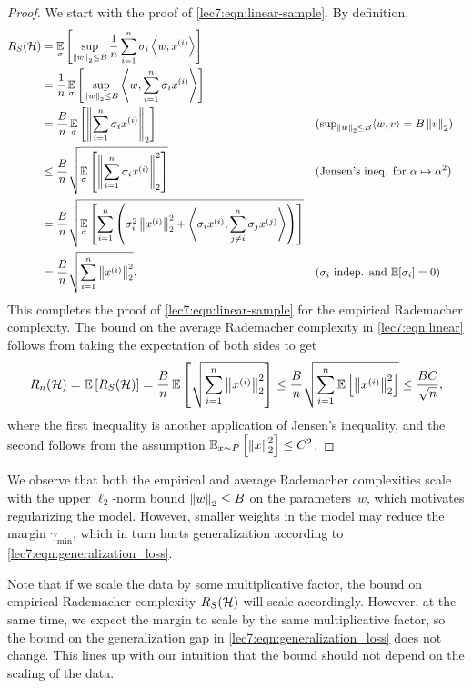 \begin{proof}
We start with the proof of \eqref{lec7:eqn:linear-sample}. By definition,
\begin{align}
    R_S(\mathcal{H}) 
    &= \operatorname*{\mathbb{E}}_\sigma\left[ \sup_{\left\|w\right\|_2 \le B} \frac{1}{n} \sum_{i=1}^n\sigma_i \left\langle w,x^{(i)}\right\rangle \right]
    \\&= \frac{1}{n} \operatorname*{\mathbb{E}}_\sigma\left[ \sup_{\left\|w\right\|_2 \le B} \left\langle w,\sum_{i=1}^n\sigma_i x^{(i)}\right\rangle \right]
    \\&= \frac{B}{n} \operatorname*{\mathbb{E}}_\sigma\left[ \left\|\sum_{i=1}^n \sigma_i  x^{(i)}\right\|_2 \right]
        &&\text{($\textstyle\sup_{\left\|w\right\|_2 \le B} \langle w,v\rangle =B\left\|v\right\|_2$)}
    \\&\leq \frac{B}{n} \sqrt{ \operatorname*{\mathbb{E}}_\sigma\left[\left\| \sum_{i=1}^n \sigma_i x^{(i)} \right\|_2^2\right] }
        &&\text{(Jensen's ineq. for $\alpha \mapsto \alpha^2$)} 
    \\&= \frac{B}{n} \sqrt{ \operatorname*{\mathbb{E}}_\sigma \left[\sum_{i=1}^n \left(\sigma_i^2 \left\|x^{(i)}\right\|_2^2 + \left\langle\sigma_ix^{(i)},\sum_{j \ne i}^n \sigma_j x^{(j)}\right\rangle \right)\right] }
    \\&= \frac{B}{n} \sqrt{\sum_{i=1}^n \left\|x^{(i)}\right\|_2^2}.
        &&\text{($\sigma_i$ indep. and $\operatorname*{\mathbb{E}}[\sigma_i]=0$)}
\end{align}
This completes the proof of \eqref{lec7:eqn:linear-sample} for the empirical Rademacher complexity. The bound on the average Rademacher complexity in \eqref{lec7:eqn:linear} follows from taking the expectation of both sides to get
\begin{equation}
    R_n(\mathcal{H}) = \operatorname*{\mathbb{E}}\left[ R_S(\mathcal{H}) \right]
    = \frac{B}{n} \operatorname*{\mathbb{E}}\left[ \sqrt{\sum_{i=1}^n \left\|x^{(i)}\right\|_2^2} \right]
    \le \frac{B}{n} \sqrt{ \sum_{i=1}^n \operatorname*{\mathbb{E}}\left[\left\|x^{(i)}\right\|_2^2\right] }
    \le \frac{BC}{\sqrt{n}},
\end{equation}
where the first inequality is another application of Jensen's inequality, and the second follows from the assumption $\operatorname*{\mathbb{E}}_{x \sim P}\left[\left\|x\right\|_2^2\right] \leq C^2$.

\end{proof}

We observe that both the empirical and average Rademacher complexities scale with the upper $\ell_2$-norm bound $\left\|w\right\|_2 \le B$ on the parameters~$w$, which motivates regularizing the model. However, smaller weights in the model may reduce the margin $\gamma_\mathrm{min}$, which in turn hurts generalization according to \eqref{lec7:eqn:generalization_loss}.

\begin{remark}
Note that if we scale the data by some multiplicative factor, the bound on empirical Rademacher complexity $R_S(\mathcal H)$ will scale accordingly. However, at the same time, we expect the margin to scale by the same multiplicative factor, so the bound on the generalization gap in \eqref{lec7:eqn:generalization_loss} does not change. This lines up with our intuition that the bound should not depend on the scaling of the data.
\end{remark}

